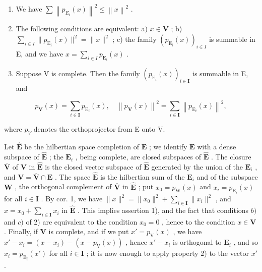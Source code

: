 \begin{enumerate}
\def\labelenumi{\arabic{enumi})}
\item
  We have \(\sum\left\|p_{E_{i}}(x)\right\|^{2}\leqslant\left\|x\right\|^{2}\) .
\item
  The following conditions are equivalent: a) \(x \in \mathbf{V}\) ; b) \(\sum_{i \in I} \| p_{\mathrm{E}_i}(x) \|^2 = \| x \|^2\) ; c) the family \((p_{\mathrm{E}_i}(x))_{i \in I}\) is summable in E, and we have \(x = \sum_{i \in I} p_{\mathrm{E}_i}(x)\) .
\item
  Suppose V is complete. Then the family \((p_{\mathrm{E}_i}(x))_{i\in \mathbf{I}}\) is summable in E, and
\end{enumerate}

\[
p _ {\mathbf {V}} (x) = \sum_ {i \in \mathbf {I}} p _ {\mathrm{E} _ {i}} (x), \quad \left\| p _ {\mathbf {V}} (x) \right\| ^ {2} = \sum_ {i \in \mathbf {I}} \left\| p _ {\mathrm{E} _ {i}} (x) \right\| ^ {2},
\]

where \(p_{V}\) denotes the orthoprojector from E onto V.

Let \(\hat{\mathbf{E}}\) be the hilbertian space completion of \(\mathbf{E}\) ; we identify \(\mathbf{E}\) with a dense subspace of \(\hat{\mathbf{E}}\) ; the \(\mathbf{E}_i\) , being complete, are closed subspaces of \(\hat{\mathbf{E}}\) . The closure \(\overline{\mathbf{V}}\) of \(\mathbf{V}\) in \(\hat{\mathbf{E}}\) is the closed vector subspace of \(\hat{\mathbf{E}}\) generated by the union of the \(\mathbf{E}_i\) , and \(\mathbf{V} = \overline{\mathbf{V}} \cap \mathbf{E}\) . The space \(\hat{\mathbf{E}}\) is the hilbertian sum of the \(\mathbf{E}_i\) and of the subspace \(\mathbf{W}\) , the orthogonal complement of \(\overline{\mathbf{V}}\) in \(\hat{\mathbf{E}}\) ; put \(x_0 = p_{\mathrm{W}}(x)\) and \(x_i = p_{\mathrm{E}_i}(x)\) for all \(i \in \mathbf{I}\) . By cor. 1, we have \(\| x\|^2 = \| x_0\|^2 + \sum_{i \in \mathbf{I}} \| x_i\|^2\) , and \(x = x_0 + \sum_{i \in \mathbf{I}} x_i\) in \(\hat{\mathbf{E}}\) . This implies assertion 1), and the fact that conditions \(b)\) and \(c)\) of 2) are equivalent to the condition \(x_0 = 0\) , hence to the condition \(x \in \mathbf{V}\) . Finally, if \(\mathbf{V}\) is complete, and if we put \(x' = p_{\mathrm{V}}(x)\) , we have \(x' - x_i = (x - x_i) - (x - p_{\mathrm{V}}(x))\) , hence \(x' - x_i\) is orthogonal to \(\mathbf{E}_i\) , and so \(x_i = p_{\mathrm{E}_i}(x')\) for all \(i \in \mathbf{I}\) ; it is now enough to apply property 2) to the vector \(x'\) .

